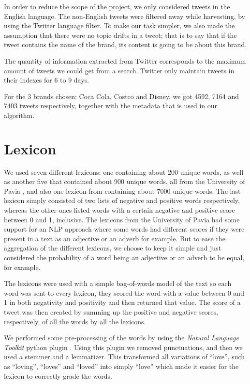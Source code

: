 \documentclass[a4paper,12pt]{report}
\begin{document}
In order to reduce the scope of the project, we only considered tweets in the English language. 
The non-English tweets were filtered away while harvesting, by using the Twitter language filter.
To make our task simpler, we also made the assumption that there were no topic drifts in a tweet;
that is to say that if the tweet contains the name of the brand, its content is going to be about this brand.

The quantity of information extracted from Twitter corresponds to the maximum amount of tweets we could get from a search.
Twitter only maintain tweets in their indexes for 6 to 9 days.\cite{Twitter}

For the 3 brands chosen: Coca Cola, Costco and Disney, we got 4592, 7164 and 7403 tweets respectively, together with the metadata that is used in our algorithm.

\section{Lexicon}

We used seven different lexicons: one containing about 200 unique words, as well as another five that contained about 900 unique words, all from the University of Pavia \cite{WNOP07}, and also one lexicon from \cite{Liu04} containing about 7000 unique words.
The last lexicon simply consisted of two lists of negative and positive words respectively, whereas the other ones listed words with a certain negative and positive score between 0 and 1, inclusive. 
The lexicons from the University of Pavia had some support for an NLP approach where some words had different scores if they were present in a text as an adjective or an adverb for example.  
But to ease the aggregation of the different lexicons, we choose to keep it simple and just considered the probability of a word being an adjective or an adverb to be equal, for example.

The lexicons were used with a simple bag-of-words model of the text so each word was sent to every lexicon, they scored the word with a value between 0 and 1 in both negativity and positivity and then returned that value. 
The score of a tweet was then created by summing up the positive and negative scores, respectively, of all the words by all the lexicons.

We performed some pre-processing of the words by using the \textit{Natural Language Toolkit} python plugin \cite{NLTK}.
Using this plugin we removed punctuations, and then we used a stemmer and a lemmatizer. This transformed all variations of ``love'', such as ``loving'', ``loves'' and ``loved'' into simply ``love'' which made it easier for the lexicon to correctly grade the words.
\end{document}
